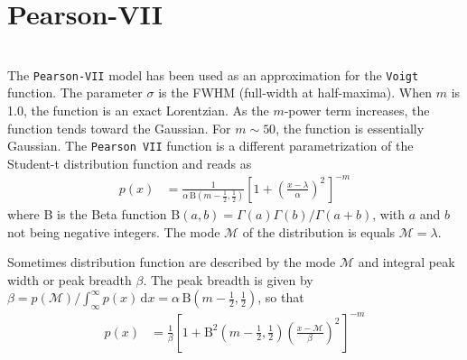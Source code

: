 \section{Pearson-VII} ~\\
\label{sec:PearsonVII}
The \texttt{Pearson-VII} model has been used as
an approximation for the \texttt{Voigt} function.
The parameter $\sigma$ is the FWHM (full-width at half-maxima). When
$m$ is 1.0, the function is an exact Lorentzian. As the $m$-power term
increases, the function tends toward the Gaussian. For $m\sim 50$, the
function is essentially Gaussian. The \texttt{Pearson VII} function is a different
parametrization of the Student-t distribution function and reads as
\begin{align}
    p(x) &= \frac{1}{\alpha\,\mathrm{B}\!\left(m-\frac12, \frac12\right)}
        \left[1 + \left(\frac{x-\lambda}{\alpha}\right)^{\!2\,} \right]^{-m}
\end{align}
where B is the Beta function $\mathrm{B}(a,b)=\Gamma(a)\Gamma(b)/\Gamma(a+b)$, with $a$ and $b$ not being negative integers. The mode $\mathcal{M}$ of the distribution is equals $\mathcal{M} = \lambda$.

Sometimes distribution function are described by the mode $\mathcal{M}$ and integral peak width or peak breadth $\beta$. The peak breadth is given by $\beta=p(\mathcal{M})/\int_{\infty}^\infty p(x)\, \mathrm{d}x = \alpha\,\mathrm{B}\left(m-\frac12, \frac12\right)$, so that
\begin{align}
    p(x) &= \frac{1}{\beta}
        \left[1 + \mathrm{B}^2\left(m-\frac12, \frac12\right)\left(\frac{x-\mathcal{M}}{\beta}\right)^{\!2\,} \right]^{-m}
\end{align}

